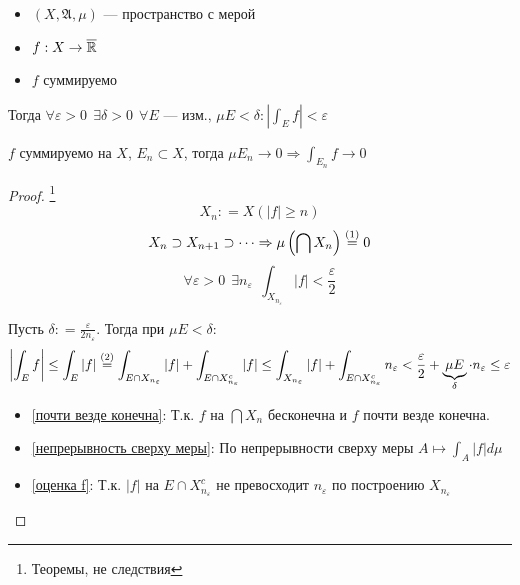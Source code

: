 

\cfoot{}



\begin{theorem}\itemfix
    \begin{itemize}
        \item \((X, \mathfrak{A}, \mu)\) --- пространство с мерой
        \item \(f : X \to \overline {\mathbb{R}}\)
        \item \(f\) суммируемо
    \end{itemize}

    Тогда \(\forall \varepsilon > 0 \ \ \exists \delta > 0 \ \ \forall E \text{ --- изм., } \mu E < \delta : \left|\int_E f\right|< \varepsilon\)
\end{theorem}
\begin{corollary}
    \(f\) суммируемо на \(X\), \(E_n \subset X\), тогда \(\mu E_n \to 0 \Rightarrow \int_{E_n} f \to 0\)
\end{corollary}
\begin{proof}\footnote{Теоремы, не следствия}
    \[X_n : = X(|f| \geq n)\]
    \[X_n \supset X_{n+1} \supset \dots \Rightarrow \mu\left( \bigcap X_n \right) \symrefeq{почти везде конечна} 0\]
    \begin{equation}
        \forall \varepsilon > 0 \ \ \exists n_\varepsilon \ \ \int_{X_{n_\varepsilon}} |f| < \frac{\varepsilon}{2} \label{непрерывность сверху меры}
    \end{equation}

    Пусть \(\delta : = \frac{\varepsilon}{2n_\varepsilon} \). Тогда при \(\mu E < \delta\):
    \[\left|\int_E f\right| \leq \int_E |f| \symrefeq{оценка f} \int_{E\cap X_{n_\varepsilon}} |f| + \int_{E\cap X_{n_\varepsilon}^c} |f| \leq \int_{X_{n_\varepsilon}} |f| + \int_{E\cap X_{n_\varepsilon}^c} n_\varepsilon < \frac{\varepsilon}{2} + \underbrace{\mu E}_{\delta} \cdot n_\varepsilon \leq \varepsilon\]

    \begin{itemize}
        \item \eqref{почти везде конечна}: Т.к. \(f\) на \(\bigcap X_n\) бесконечна и \(f\) почти везде конечна.
        \item \eqref{непрерывность сверху меры}: По непрерывности сверху меры \(A \mapsto \int_A |f| d\mu\)
        \item \eqref{оценка f}: Т.к. \(|f|\) на \(E \cap X_{n_\varepsilon}^c\) не превосходит \(n_\varepsilon\) по построению \(X_{n_\varepsilon}\)
    \end{itemize}
\end{proof}

